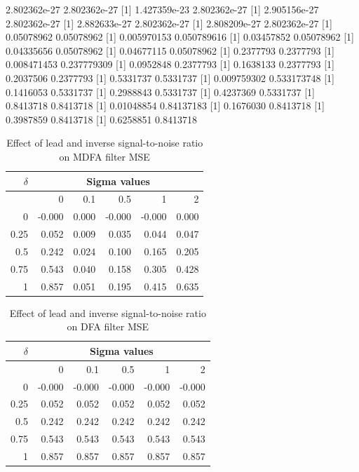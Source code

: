 \documentclass[a4paper]{book}
\begin{document}
\begin{Schunk}
\begin{Soutput}
[1] 2.802362e-27 2.802362e-27
[1] 1.427359e-23 2.802362e-27
[1] 2.905156e-27 2.802362e-27
[1] 2.882633e-27 2.802362e-27
[1] 2.808209e-27 2.802362e-27
[1] 0.05078962 0.05078962
[1] 0.005970153 0.050789616
[1] 0.03457852 0.05078962
[1] 0.04335656 0.05078962
[1] 0.04677115 0.05078962
[1] 0.2377793 0.2377793
[1] 0.008471453 0.237779309
[1] 0.0952848 0.2377793
[1] 0.1638133 0.2377793
[1] 0.2037506 0.2377793
[1] 0.5331737 0.5331737
[1] 0.009759302 0.533173748
[1] 0.1416053 0.5331737
[1] 0.2988843 0.5331737
[1] 0.4237369 0.5331737
[1] 0.8413718 0.8413718
[1] 0.01048854 0.84137183
[1] 0.1676030 0.8413718
[1] 0.3987859 0.8413718
[1] 0.6258851 0.8413718
\end{Soutput}
\end{Schunk}

\begin{table}[ht]
\centering
\begin{tabular}{rrrrrr}
  $\delta$& \multicolumn{5}{c}{Sigma values}\\ \hline
 & 0 & 0.1 & 0.5 & 1 & 2 \\ 
  \hline
0 & -0.000 & 0.000 & -0.000 & -0.000 & 0.000 \\ 
  0.25 & 0.052 & 0.009 & 0.035 & 0.044 & 0.047 \\ 
  0.5 & 0.242 & 0.024 & 0.100 & 0.165 & 0.205 \\ 
  0.75 & 0.543 & 0.040 & 0.158 & 0.305 & 0.428 \\ 
  1 & 0.857 & 0.051 & 0.195 & 0.415 & 0.635 \\ 
   \hline
\end{tabular}
\caption{Effect of lead and  inverse signal-to-noise ratio on MDFA filter MSE} 
\label{tab:critmdfa.mat}
\end{table}%
\begin{table}[ht]
\centering
\begin{tabular}{rrrrrr}
  $\delta$& \multicolumn{5}{c}{Sigma values}\\ \hline
 & 0 & 0.1 & 0.5 & 1 & 2 \\ 
  \hline
0 & -0.000 & -0.000 & -0.000 & -0.000 & -0.000 \\ 
  0.25 & 0.052 & 0.052 & 0.052 & 0.052 & 0.052 \\ 
  0.5 & 0.242 & 0.242 & 0.242 & 0.242 & 0.242 \\ 
  0.75 & 0.543 & 0.543 & 0.543 & 0.543 & 0.543 \\ 
  1 & 0.857 & 0.857 & 0.857 & 0.857 & 0.857 \\ 
   \hline
\end{tabular}
\caption{Effect of lead and  inverse signal-to-noise ratio on DFA filter MSE} 
\label{tab:critudfa.mat}
\end{table}
\end{document}
